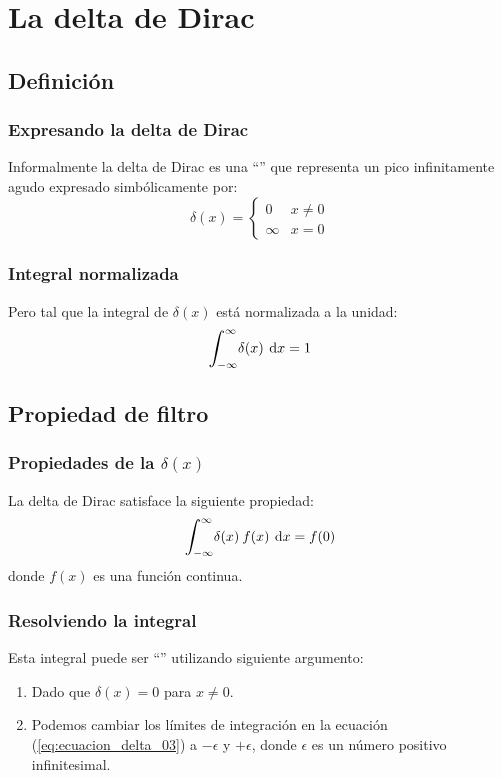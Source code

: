 \documentclass[12pt]{beamer}
\begin{document}
\section{La delta de Dirac}
\subsection{Definición}

\begin{frame}
\frametitle{Expresando la delta de Dirac}
Informalmente la delta de Dirac es una \enquote{} que representa un pico infinitamente agudo expresado simbólicamente por:
\pause
\begin{equation}
\delta (x) = \begin{cases}
0 & x \neq 0 \\
\infty & x = 0
\end{cases}
\label{eq:ecuacion_delta_01}
\end{equation}
\end{frame}

\begin{frame}
\frametitle{Integral normalizada}
Pero tal que la integral de $\delta (x)$ está normalizada a la unidad:
\pause
\begin{equation}
\scaleint{6ex}_{\bs -\infty}^{\infty} \delta (x) \: \dd{x} = 1 
\label{eq:ecuacion_delta_02}
\end{equation}
\end{frame}

\subsection{Propiedad de filtro}

\begin{frame}
\frametitle{Propiedades de la $\delta (x)$}
La delta de Dirac satisface la siguiente propiedad:
\pause
\begin{equation}
\scaleint{6ex}_{\bs -\infty}^{\infty} \delta (x) \: f (x) \: \dd{x} = f (0)
\label{eq:ecuacion_delta_03}
\end{equation}
donde $f (x)$ es una función continua.
\end{frame}

\begin{frame}
\frametitle{Resolviendo la integral}
Esta integral puede ser \enquote{} utilizando siguiente argumento: \pause
{}
\begin{enumerate}[<+->]
\item Dado que $\delta (x) = 0$ para $x \neq 0$.
\item Podemos cambiar los límites de integración en la ecuación (\ref{eq:ecuacion_delta_03}) a $- \epsilon$ y $+ \epsilon$, donde $\epsilon$ es un número positivo infinitesimal.
\seti
\end{enumerate}
\end{frame}
\end{document}

